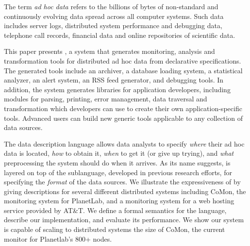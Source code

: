 The term {\em ad hoc data} refers to the billions of bytes of
non-standard and continuously evolving data spread across all computer
systems.  Such data includes server logs, distributed system
performance and debugging data, 
telephone call records, financial data and online repositories of
scientific data.

This paper presents \padsd{}, a system that generates monitoring,
analysis and transformation tools for distributed ad hoc data from
declarative specifications.  The generated tools include an archiver,
a database loading system, a statistical analyzer, an alert system, 
an RSS feed generator, and
debugging tools.  In addition, the system generates libraries for
application developers, including modules for parsing, printing, error
management, data traversal and transformation which developers can use
to create their own application-specific tools.  Advanced users can
build new generic tools applicable to any collection of data sources.

The \padsd{} data description language allows data analysts to specify
{\em where} their ad hoc data is located, {\em how} to obtain it, {\em
when} to get it (or give up trying), and {\em what}
preprocessing the system should do when it arrives.  As its name
suggests, \padsd{} is layered on top of the \pads{} sublanguage,
developed in previous research efforts, for specifying the {\em
format} of the data sources.  We illustrate the expressiveness of
\padsd{} by giving descriptions for several different distributed
systems including CoMon, the monitoring system for PlanetLab, and a
monitoring system for a web hosting service provided by AT\&T.  We
define a formal semantics for the language, describe our
implementation, and evaluate its performance.  We show our system is
capable of scaling to distributed systems the size of CoMon,
the current monitor for Planetlab's 800+ nodes.



